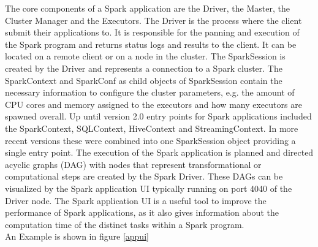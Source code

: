 \noindent The core components of a Spark application are the Driver, the Master, the Cluster Manager and the Executors. The Driver is the process where the client submit their applications to. It is responsible for the panning and execution of the Spark program and returns status logs and results to the client. It can be located on a remote client or on a node in the cluster. The SparkSession is created by the Driver and represents a connection to a Spark cluster. The SparkContext and SparkConf as child objects of SparkSession contain the necessary information to configure the cluster parameters, e.g. the amount of CPU cores and memory assigned to the executors and how many executors are spawned overall. Up until version 2.0 entry points for Spark applications included the SparkContext, SQLContext, HiveContext and StreamingContext. In more recent versions these were combined into one SparkSession object providing a single entry point.
The execution of the Spark application is planned and directed acyclic graphs (DAG) with nodes that represent transformational or computational steps are created by the Spark Driver. These DAGs can be visualized by the Spark application UI typically running on port 4040 of the Driver node. The Spark application UI is a useful tool to improve the performance of Spark applications, as it also gives information about the computation time of the distinct tasks within a Spark program. \cite[pp. 45 ff]{sparkbook1}\\
An Example is shown in figure \ref{appui}\\

